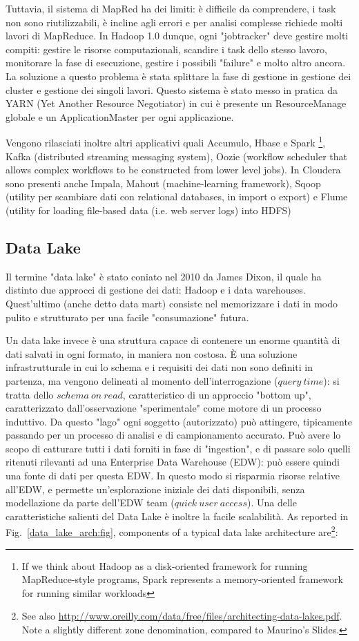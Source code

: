 \documentclass[a4page, 11pt]{article}
\begin{document}
Tuttavia, il sistema di MapRed ha dei limiti: è difficile da comprendere, i task non sono riutilizzabili, è incline agli errori e per analisi complesse richiede molti lavori di MapReduce. In Hadoop 1.0 dunque, ogni "jobtracker" deve gestire molti compiti: gestire le risorse computazionali, scandire i task dello stesso lavoro, monitorare la fase di esecuzione, gestire i possibili "failure" e molto altro ancora. La soluzione a questo problema è stata splittare la fase di gestione in gestione dei cluster e gestione dei singoli lavori. Questo sistema è stato messo in pratica da YARN (Yet Another Resource Negotiator) in cui è presente un ResourceManage globale e un ApplicationMaster per ogni applicazione.

Vengono rilasciati inoltre altri applicativi quali Accumulo, Hbase e Spark \footnote{If we think about Hadoop as a disk-oriented framework for running MapReduce-style programs, Spark represents a memory-oriented framework for running similar workloads}, Kafka (distributed streaming messaging system), Oozie (workflow scheduler that allows complex workflows to be constructed from lower level jobs).
In Cloudera sono presenti anche Impala, Mahout (machine-learning framework), Sqoop (utility per scambiare dati con relational databases, in import o export) e Flume (utility for loading file-based data (i.e. web server logs) into HDFS) 

\subsection{Data Lake}
Il termine "data lake" è stato coniato nel 2010 da James Dixon, il quale ha distinto due approcci di gestione dei dati: Hadoop e i data warehouses. Quest’ultimo (anche detto data mart) consiste nel memorizzare i dati in modo pulito e strutturato per una facile "consumazione" futura.

Un data lake invece è una struttura capace di contenere un enorme quantità di dati salvati in ogni formato, in maniera non costosa.
\`E una soluzione infrastrutturale in cui lo schema e i requisiti dei dati non sono definiti in partenza, ma vengono delineati al momento dell'interrogazione ($query\ time$): si tratta dello $schema\ on\ read$, caratteristico di un approccio "bottom up", caratterizzato dall'osservazione "sperimentale" come motore di un processo induttivo. 
Da questo "lago" ogni soggetto (autorizzato) può attingere, tipicamente passando per un processo di analisi e di campionamento accurato. 
Può avere lo scopo di catturare tutti i dati forniti in fase di "ingestion", e di passare solo quelli ritenuti rilevanti ad una Enterprise Data Warehouse (EDW): può essere quindi una fonte di dati per questa EDW. In questo modo si risparmia risorse relative all'EDW, e permette un'esplorazione iniziale dei dati disponibili, senza modellazione da parte dell'EDW team ($quick\ user \ access$).
Una delle caratteristiche salienti del Data Lake è inoltre la facile scalabilità. 
As reported in Fig.~\ref{data_lake_arch:fig}, components of a typical data lake architecture are\footnote{See also \url{http://www.oreilly.com/data/free/files/architecting-data-lakes.pdf}. Note a slightly different zone denomination, compared to Maurino's Slides.}:
\end{document}

